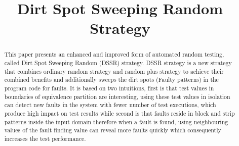 \documentclass[conference]{IEEEtran}
\begin{document}
\title{Dirt Spot Sweeping Random Strategy}
\author{

\and
{}
}

\maketitle

\begin{abstract}
This paper presents an enhanced and improved form of automated random testing, called Dirt Spot Sweeping Random (DSSR) strategy. DSSR strategy is a new strategy that combines ordinary random strategy and random plus strategy to achieve their combined benefits and additionally sweeps the dirt spots (Faulty patterns) in the program code for faults. It is based on two intuitions, first is that test values in boundaries of equivalence partition are interesting, using these test values in isolation can detect new faults in the system with fewer number of test executions, which produce high impact on test results while second is that faults reside in block and strip patterns inside the input domain therefore when a fault is found, using neighbouring values of the fault finding value can reveal more faults quickly which consequently increases the test performance.
\end{abstract}
\IEEEpeerreviewmaketitle



\end{document}
